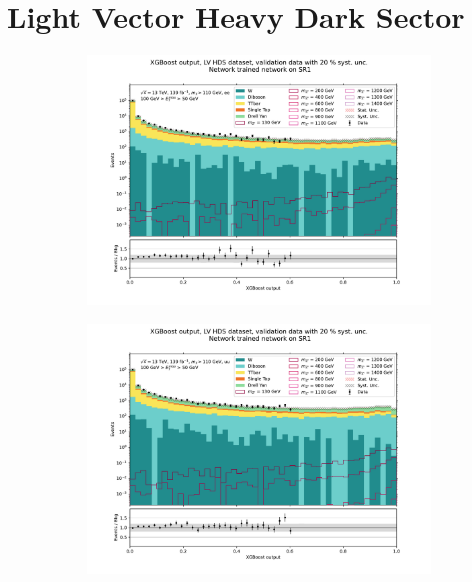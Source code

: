 \documentclass[12pt, a4paper]{book}
\begin{document}
\section{Light Vector Heavy Dark Sector}
\begin{figure}[!ht]
	\centering
	\begin{subfigure}[b]{0.49\textwidth}
      \centering
      \includegraphics[width=1\textwidth]{XGBoost/Model_independent/50-100/LV_HDS/VAL_ee.pdf}
   \end{subfigure}
   \hfill
   \begin{subfigure}[b]{0.49\textwidth}
      \centering
      \includegraphics[width=1\textwidth]{XGBoost/Model_independent/50-100/LV_HDS/VAL_uu.pdf}
   \end{subfigure}
   \hfill

\end{figure}
\end{document}

